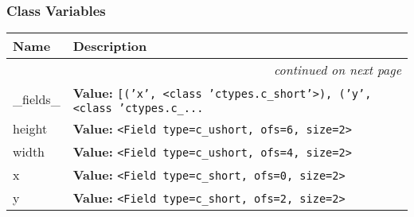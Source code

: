 
  \subsubsection{Class Variables}

    \vspace{-1cm}
\hspace{\varindent}\begin{longtable}{|p{\varnamewidth}|p{\vardescrwidth}|l}
\cline{1-2}
\cline{1-2} \centering \textbf{Name} & \centering \textbf{Description}& \\
\cline{1-2}
\endhead\cline{1-2}\multicolumn{3}{r}{\small\textit{continued on next page}}\\\endfoot\cline{1-2}
\endlastfoot\raggedright \_\-f\-i\-e\-l\-d\-s\-\_\- & \raggedright \textbf{Value:} 
{\tt \texttt{[}\texttt{(}\texttt{'}\texttt{x}\texttt{'}\texttt{, }{\textless}class 'ctypes.c\_short'{\textgreater}\texttt{)}\texttt{, }\texttt{(}\texttt{'}\texttt{y}\texttt{'}\texttt{, }{\textless}class 'ctypes.c\_\texttt{...}}&\\
\cline{1-2}
\raggedright h\-e\-i\-g\-h\-t\- & \raggedright \textbf{Value:} 
{\tt {\textless}Field type=c\_ushort, ofs=6, size=2{\textgreater}}&\\
\cline{1-2}
\raggedright w\-i\-d\-t\-h\- & \raggedright \textbf{Value:} 
{\tt {\textless}Field type=c\_ushort, ofs=4, size=2{\textgreater}}&\\
\cline{1-2}
\raggedright x\- & \raggedright \textbf{Value:} 
{\tt {\textless}Field type=c\_short, ofs=0, size=2{\textgreater}}&\\
\cline{1-2}
\raggedright y\- & \raggedright \textbf{Value:} 
{\tt {\textless}Field type=c\_short, ofs=2, size=2{\textgreater}}&\\
\cline{1-2}
\end{longtable}



